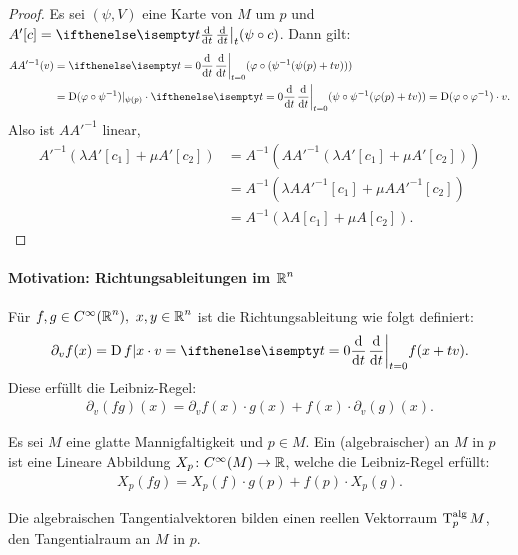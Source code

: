 \begin{proof}
  Es sei $(\psi, V)$ eine Karte von $M$ um $p$ und $A'[c] = \difffrac[t]{}{t}(\psi \circ c)$. Dann gilt:
  \begin{align*}
    A A'^{-1}(v) & = \difffrac[t=0]{}{t}(\varphi \circ (\psi^{-1} (\psi(p) + tv)))\\
    & = \D(\varphi \circ \psi^{-1})|_{\psi(p)} \cdot \difffrac[t=0]{}{t}(\psi \circ \psi^{-1}(\varphi(p) + tv)) = \D (\varphi \circ \varphi^{-1}) \cdot v.
  \end{align*}
  Also ist $A A'^{-1}$ linear,
  \begin{align*}
    A'^{-1}(\lambda A'[c_1] + \mu A'[c_2]) & = A^{-1}(A A'^{-1}(\lambda A'[c_1] + \mu A'[c_2]))\\
    & = A^{-1} (\lambda A A'^{-1}[c_1] + \mu A A'^{-1} [c_2])\\
    & = A^{-1}(\lambda A [c_1] + \mu A [c_2]).
  \end{align*}
\end{proof}



\paragraph{Motivation: Richtungsableitungen im $\operatorname{\mathbb{R}}^n$}\hfill
\begin{bem}
  
  Für $f,g \in C^{\infty}(\operatorname{\mathbb{R}}^n), \ x,y \in \operatorname{\mathbb{R}}^n$ ist die Richtungsableitung wie folgt definiert:
  \begin{align*}
    \partial_vf(x) = \D f|x \cdot v = \difffrac[t=0]{}{t}f(x+tv).
  \end{align*}
  Diese erfüllt die Leibniz-Regel:
  \begin{align*}
    \partial_v(fg)(x) = \partial_vf(x)\cdot g(x) + f(x) \cdot \partial_v(g)(x).
  \end{align*}
\end{bem}

\begin{dfn}
  Es sei $M$ eine glatte Mannigfaltigkeit und $p\in M$. Ein (algebraischer)  an $M$ in $p$ ist eine Lineare Abbildung $X_p \colon C^{\infty}(M) \to \operatorname{\mathbb{R}}$, welche die Leibniz-Regel erfüllt:
  \begin{align*}
    X_p(fg) = X_p(f) \cdot g(p) + f(p) \cdot X_p(g).
  \end{align*}

  Die algebraischen Tangentialvektoren bilden einen reellen Vektorraum $\operatorname{T}_p^{\text{alg}}M$, den Tangentialraum an $M$ in $p$.
\end{dfn}


